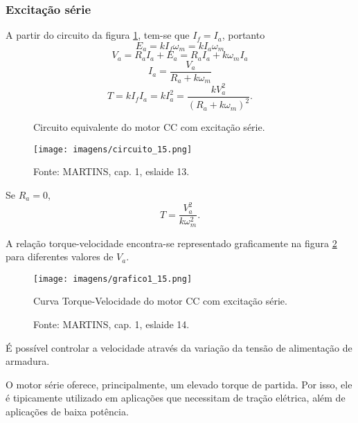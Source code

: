 \subsubsection{Excitação série}
 
A partir do circuito da figura \ref{fig:C15}, tem-se que $I_{f}=I_{a}$, portanto
\[E_{a} = kI_{f}\omega_{m} = kI_{a}\omega_{m}\]
\[V_{a} = R_{a}I_{a} + E_{a} = R_{a}I_{a} + k\omega_{m}I_{a}\]
\[I_{a} = \frac{V_{a}}{R_{a} + k\omega_{m}}\]
\[T = kI_{f}I_{a} = kI_{a}^{2} = \frac{kV_{a}^{2}}{(R_{a} + k\omega_{m})^{2}}.\]
 
\begin{figure}[ht!]
\center
\caption{\label{fig:C15} Circuito equivalente do motor CC com excitação série.}
\texttt{[image: imagens/circuito\_15.png]}
\caption*{Fonte: MARTINS, cap. 1, eslaide 13.}
\end{figure}


Se $R_{a} = 0$,
\[T = \frac{V_{a}^{2}}{k\omega_{m}^{2}}.\]

A relação torque-velocidade encontra-se representado graficamente na figura \ref{fig:G1_15} para diferentes valores de $V_{a}$.

\begin{figure}[t!]
\center
\texttt{[image: imagens/grafico1\_15.png]}
\caption{\label{fig:G1_15}Curva Torque-Velocidade do motor CC com excitação série.}
\caption*{Fonte: MARTINS, cap. 1, eslaide 14.}
\end{figure}
 
É possível controlar a velocidade através da variação da tensão de alimentação de armadura.

O motor série oferece, principalmente, um elevado torque de partida. Por isso, ele é tipicamente utilizado em aplicações que necessitam de tração elétrica, além de aplicações de baixa potência.
